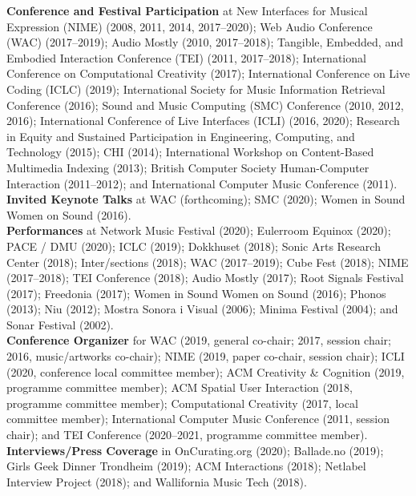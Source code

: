 \documentclass[10pt, a4paper]{article}
\begin{document}
{\textbf{Conference and Festival Participation}} at New Interfaces for Musical Expression (NIME) (2008, 2011, 2014, 2017--2020); Web Audio Conference (WAC) (2017--2019); Audio Mostly (2010, 2017--2018); Tangible, Embedded, and Embodied Interaction Conference (TEI) (2011, 2017--2018); International Conference on Computational Creativity (2017); International Conference on Live Coding (ICLC) (2019); International Society for Music Information Retrieval Conference (2016); Sound and Music Computing (SMC) Conference (2010, 2012, 2016); International Conference of Live Interfaces (ICLI) (2016, 2020); Research in Equity and Sustained Participation in Engineering, Computing, and Technology (2015); CHI (2014); International Workshop on Content-Based Multimedia Indexing (2013); British Computer Society Human-Computer Interaction (2011--2012); and International Computer Music Conference (2011).\\

{\textbf{Invited Keynote Talks}} at WAC (forthcoming); SMC (2020); Women in Sound Women on Sound (2016).\\

{\textbf{Performances}} at Network Music Festival (2020); Eulerroom Equinox (2020); PACE / DMU (2020); ICLC (2019); Dokkhuset (2018); Sonic Arts Research Center (2018); Inter/sections (2018); WAC (2017--2019); Cube Fest (2018); NIME (2017--2018); TEI Conference (2018); Audio Mostly (2017); Root Signals Festival (2017); Freedonia (2017); Women in Sound Women on Sound (2016); Phonos (2013); Niu (2012); Mostra Sonora i Visual (2006); Minima Festival (2004); and Sonar Festival (2002).\\

{\textbf{Conference Organizer}} for WAC (2019, general co-chair; 2017, session chair; 2016, music/artworks co-chair); NIME (2019, paper co-chair, session chair); ICLI (2020, conference local committee member); ACM Creativity \& Cognition (2019, programme committee member); ACM Spatial User Interaction (2018, programme committee member); Computational Creativity (2017, local committee member); International Computer Music Conference (2011, session chair); and TEI Conference (2020--2021, programme committee member).\\

{\textbf{Interviews/Press Coverage}} in OnCurating.org (2020); Ballade.no (2019); Girls Geek Dinner Trondheim (2019); ACM Interactions (2018); Netlabel Interview Project (2018); and Wallifornia Music Tech (2018).\\
\end{document}
